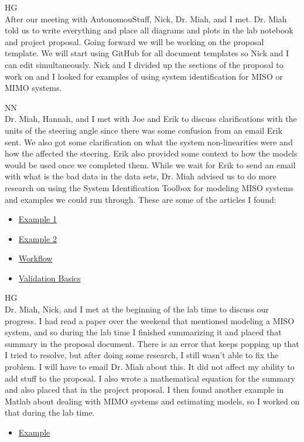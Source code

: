 \documentclass[fontsize=11pt, %
                             paper=letter, %
                             openany, %
                             captions=tableheading,
                             index=totoc,
                             hyperref]{labbook}
\def\currentYear{2021}
\begin{document}
\begin{addmargin}[0cm]{0cm}
HG\\ 
After our meeting with AutonomouStuff, Nick, Dr. Miah, and I met. Dr. Miah told us to write everything and place all diagrams and plots in the lab notebook and project proposal. Going forward we will be working on the proposal template. We will start using GitHub for all document templates so Nick and I can edit simultaneously. Nick and I divided up the sections of the proposal to work on and I looked for examples of using system identification for MISO or MIMO systems. 

NN\\
Dr. Miah, Hannah, and I met with Joe and Erik to discuss clarifications with the units of the steering angle since there was some confusion from an email Erik sent. We also got some clarification on what the system non-linearities were and how the affected the steering. Erik also provided some context to how the models would be used once we completed them. While we wait for Erik to send an email with what is the bad data in the data sets, Dr. Miah advised us to do more research on using the System Identification Toolbox for modeling MISO systems and examples we could run through. These are some of the articles I found:
\begin{itemize}
	\item \href{https://www.mathworks.com/help/ident/ug/dealing-with-multi-variable-systems-identification-and-analysis.html}{Example 1}
	\item \href{https://www.mathworks.com/help/ident/ug/modal-analysis-of-a-flexible-flying-wing-aircraft.html}{Example 2}
	\item \href{https://www.mathworks.com/help/ident/gs/system-identification-workflow.html}{Workflow}
	\item \href{https://www.mathworks.com/help/ident/model-validation-basics.html}{Validation Basics}
\end{itemize}



\labday{Tuesday, October 26, \currentYear}
HG\\
Dr. Miah, Nick, and I met at the beginning of the lab time to discuss our progress. I had read a paper over the weekend that mentioned modeling a MISO system, and so during the lab time I finished summarizing it and placed that summary in the proposal document. There is an error that keeps popping up that I tried to resolve, but after doing some research, I still wasn't able to fix the problem. I will have to email Dr. Miah about this. It did not affect my ability to add stuff to the proposal. I also wrote a mathematical equation for the summary and also placed that in the project proposal. I then found another example in Matlab about dealing with MIMO systems and estimating models, so I worked on that during the lab time. 
\begin{itemize}
	\item \href{https://www.mathworks.com/help/ident/ug/dealing-with-multi-variable-systems-identification-and-analysis.html}{Example}
\end{itemize}


\end{addmargin}
\end{document}
